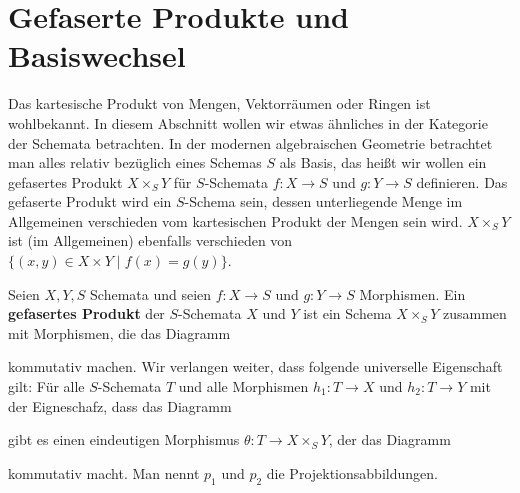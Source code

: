 
\chapter{Gefaserte Produkte und Basiswechsel}
\label{chap:8}
Das kartesische Produkt von Mengen, Vektorräumen oder Ringen ist wohlbekannt. In diesem Abschnitt wollen wir etwas ähnliches in der Kategorie der Schemata betrachten. In der modernen algebraischen Geometrie betrachtet man alles relativ bezüglich eines Schemas $S$ als Basis, das heißt wir wollen ein gefasertes Produkt $X \times_S Y$ für $S$-Schemata $f\colon X \to S$ und $g \colon Y \to S$ definieren. Das gefaserte Produkt wird ein $S$-Schema sein, dessen unterliegende Menge im Allgemeinen verschieden vom kartesischen Produkt der Mengen sein wird. $X \times_S Y$ ist (im Allgemeinen) ebenfalls verschieden von $\{(x,y) \in X \times Y\mid f(x) = g(y)\}$.

\begin{defn}
\label{defn:8.1}
	Seien $X,Y,S$ Schemata und seien $f\colon X \to S$ und $g \colon Y \to S$ Morphismen. Ein \textbf{gefasertes Produkt} der $S$-Schemata $X$ und $Y$ ist ein Schema $X\times_S Y$ zusammen mit Morphismen, die das Diagramm
	\begin{center}
	\end{center}
	kommutativ machen. Wir verlangen weiter, dass folgende universelle Eigenschaft gilt: Für alle $S$-Schemata $T$ und alle Morphismen $h_1\colon T \to X$ und $h_2\colon T \to Y$ mit der Eigneschafz, dass das Diagramm
	\begin{center}
	\end{center}
	gibt es einen eindeutigen Morphismus $\theta\colon T \to X \times_S Y$, der das Diagramm
	\begin{center}
	\end{center}
	kommutativ macht. Man nennt $p_1$ und $p_2$ die Projektionsabbildungen.
\end{defn}

